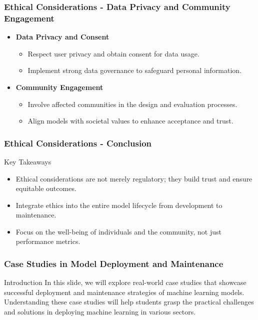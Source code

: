 \documentclass[aspectratio=169]{beamer}
\begin{document}
\begin{frame}[fragile]
    \frametitle{Ethical Considerations - Data Privacy and Community Engagement}
    \begin{itemize}
        \item \textbf{Data Privacy and Consent}
            \begin{itemize}
                \item Respect user privacy and obtain consent for data usage.
                \item Implement strong data governance to safeguard personal information.
            \end{itemize}
        \item \textbf{Community Engagement}
            \begin{itemize}
                \item Involve affected communities in the design and evaluation processes.
                \item Align models with societal values to enhance acceptance and trust.
            \end{itemize}
    \end{itemize}
\end{frame}

\begin{frame}[fragile]
    \frametitle{Ethical Considerations - Conclusion}
    \begin{block}{Key Takeaways}
        \begin{itemize}
            \item Ethical considerations are not merely regulatory; they build trust and ensure equitable outcomes.
            \item Integrate ethics into the entire model lifecycle from development to maintenance.
            \item Focus on the well-being of individuals and the community, not just performance metrics.
        \end{itemize}
    \end{block}
\end{frame}

\begin{frame}[fragile]
    \frametitle{Case Studies in Model Deployment and Maintenance}
    \begin{block}{Introduction}
        In this slide, we will explore real-world case studies that showcase successful deployment and maintenance strategies of machine learning models. 
        Understanding these case studies will help students grasp the practical challenges and solutions in deploying machine learning in various sectors.
    \end{block}
\end{frame}
\end{document}
